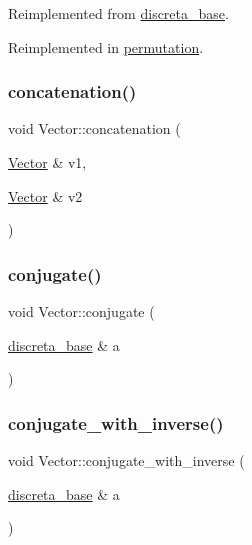 Reimplemented from \mbox{\hyperlink{classdiscreta__base_a3818444c4301d0b7ed47c3b850ea6c60}{discreta\+\_\+base}}.



Reimplemented in \mbox{\hyperlink{classpermutation_ae331b031f81647c88e72e966555c9c8f}{permutation}}.

\mbox{\label{class_vector_a2b29fadd7d7c0df93dd3711f42aff4b9}} 
\subsubsection{\texorpdfstring{concatenation()}{concatenation()}}
{\footnotesize\ttfamily void Vector\+::concatenation (\begin{DoxyParamCaption}\item[{\mbox{\hyperlink{class_vector}{Vector}} \&}]{v1,  }\item[{\mbox{\hyperlink{class_vector}{Vector}} \&}]{v2 }\end{DoxyParamCaption})}

\mbox{\label{class_vector_a477bb8091a6946d25d1c7b2e32c9a474}} 
\subsubsection{\texorpdfstring{conjugate()}{conjugate()}}
{\footnotesize\ttfamily void Vector\+::conjugate (\begin{DoxyParamCaption}\item[{\mbox{\hyperlink{classdiscreta__base}{discreta\+\_\+base}} \&}]{a }\end{DoxyParamCaption})}

\mbox{\label{class_vector_a31e4b25f3c2939f565f2a9f215a5fd19}} 
\subsubsection{\texorpdfstring{conjugate\+\_\+with\+\_\+inverse()}{conjugate\_with\_inverse()}}
{\footnotesize\ttfamily void Vector\+::conjugate\+\_\+with\+\_\+inverse (\begin{DoxyParamCaption}\item[{\mbox{\hyperlink{classdiscreta__base}{discreta\+\_\+base}} \&}]{a }\end{DoxyParamCaption})}

